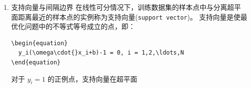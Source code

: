 \documentclass[11pt]{ctexart}
\begin{document}
\begin{enumerate}
\begin{lstlisting}
\end{subequations}
\end{lstlisting}
考虑几何间隔与函数间隔的关系，上式可以表示为函数间隔的最优化问题：
\lstset{language=[LaTeX]TeX,label= ,caption= ,captionpos=b,numbers=none}
\begin{lstlisting}
\begin{subequations}
  \begin{align}
    max_{\omega,b}&\frac{\hat{\gamma}}{||\omega||}\\\nonumber
    s.t. & y_i(\omega\cdot{}x_i+b)\geq{}\hat{\gamma}, i = 1,2,\ldots,N
  \end{align}
\end{subequations}
\end{lstlisting}
可见，当转换到最优化问题的时候，几何间隔与函数间隔是等价的，对 \(\omega\) 和 \(b\) 等比例改变数值，并不影响
最优化问题。因此，为了简便计算，我们可以令 \$\hat{\gamma}=1\$，同时，由于数学上，最大化 \(\frac{1}{||\omega||}\) 
和最小化 \(\frac{1}{2}||\omega||^2\) 是等价的，带入上式最优化问题的公式中，我们可以有下面的线性可分支持向量机
学习的最优化问题：
\lstset{language=[LaTeX]TeX,label= ,caption= ,captionpos=b,numbers=none}
\begin{lstlisting}
\begin{subequations}
  \begin{align}
    min_{\omega,b}&\frac{1}{2}||\omega||^2\\\nonumber
    s.t. & y_i(\omega\cdot{}x_i+b)-1\geq{}0, i = 1,2,\ldots,N
  \end{align}
\end{subequations}
\end{lstlisting}
上述问题是一个凸二次规划问题\footnote{可见附录2说明，凹、凸函数说明}。上述优化问题肯定有解，且解唯一\footnote{可见附录3说明，最优化问题的解}。
\item 支持向量与间隔边界
\label{sec:orgheadline71}
在线性可分情况下，训练数据集的样本点中与分离超平面距离最近的样本点的实例称为支持向量(\texttt{support vector})。
支持向量是使最优化问题中的不等式等号成立的点，即：
\lstset{language=[LaTeX]TeX,label= ,caption= ,captionpos=b,numbers=none}
\begin{lstlisting}
\begin{equation}
  y_i(\omega\cdot{}x_i+b)-1 = 0, i = 1,2,\ldots,N
\end{equation}
\end{lstlisting}
对于 \(y_i = 1\) 的正例点，支持向量在超平面
\lstset{language=[LaTeX]TeX,label= ,caption= ,captionpos=b,numbers=none}
\begin{lstlisting}

\end{lstlisting}
\end{enumerate}
\end{document}

